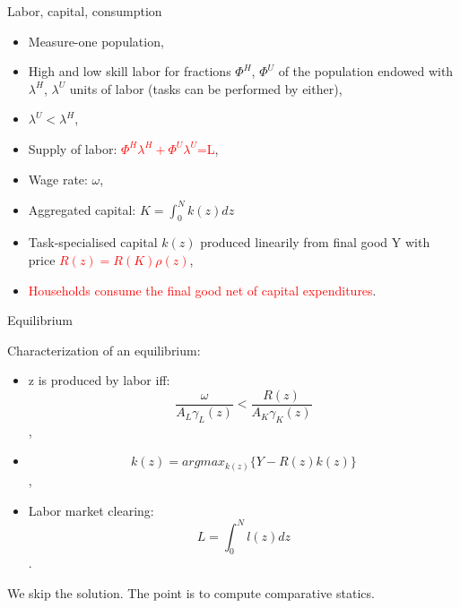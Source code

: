 \documentclass{beamer}
\begin{document}
\begin{frame}{Labor, capital, consumption}
 
\begin{itemize}
    \item Measure-one population,
    \item High and low skill labor for fractions \(\Phi^H\), \(\Phi^U\) of the population endowed with \(\lambda^H\), \(\lambda^U\) units of labor (tasks can be performed by either),
    \item \(\lambda^U < \lambda^H\),
    \item Supply of labor: \textcolor{red}{\(\Phi^H\lambda^H+\Phi^U\lambda^U\)=L},
    \item Wage rate: \(\omega\),
    \item Aggregated capital: \(K=\int_{0}^{N}k(z)dz\)
    \item Task-specialised capital \(k(z)\) produced linearily from final good Y with price \textcolor{red}{\(R(z)=R(K)\rho(z)\)},
    \item \textcolor{red}{Households consume the final good net of capital expenditures}.
\end{itemize}    

\end{frame}

\begin{frame}{Equilibrium}

Characterization of an equilibrium:

\begin{itemize}
    \item z is produced by labor iff:
    \[\frac{\omega}{A_L\gamma_L(z)}<\frac{R(z)}{A_K\gamma_K(z)}\],
    \item
    \[k(z)=argmax_{k(z)} \{Y-R(z)k(z)\}\],
    \item Labor market clearing:
    \[L=\int_{0}^{N}l(z)dz\].
\end{itemize}
We skip the solution. The point is to compute comparative statics.

\end{frame}
\end{document}
